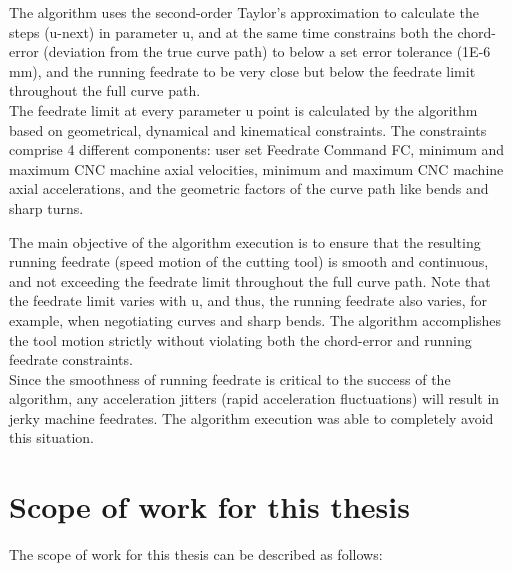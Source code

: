 The algorithm uses the second-order Taylor's approximation to calculate the steps (u-next) in parameter u, and at the same time constrains both the chord-error (deviation from the true curve path) to below a set error tolerance (1E-6 mm), and the running feedrate to be very close but below the feedrate limit throughout the full curve path. \\

The feedrate limit at every parameter u point is calculated by the algorithm based on geometrical, dynamical and kinematical constraints. The constraints comprise 4 different components: user set Feedrate Command FC, minimum and maximum CNC machine axial velocities, minimum and maximum CNC machine axial accelerations, and the geometric factors of the curve path like bends and sharp turns. \\

\clearpage
\pagebreak

The main objective of the algorithm execution is to ensure that the resulting running feedrate (speed motion of the cutting tool) is smooth and continuous, and not exceeding the feedrate limit throughout the full curve path. Note that the feedrate limit varies with u, and thus, the running feedrate also varies, for example, when negotiating curves and sharp bends. The algorithm accomplishes the tool motion strictly without violating both the chord-error and running feedrate constraints. \\

Since the smoothness of running feedrate is critical to the success of the algorithm, any acceleration jitters (rapid acceleration fluctuations) will result in jerky machine feedrates. The algorithm execution was able to completely avoid this situation. 


\section{Scope of work for this thesis}

The scope of work for this thesis can be described as follows:

